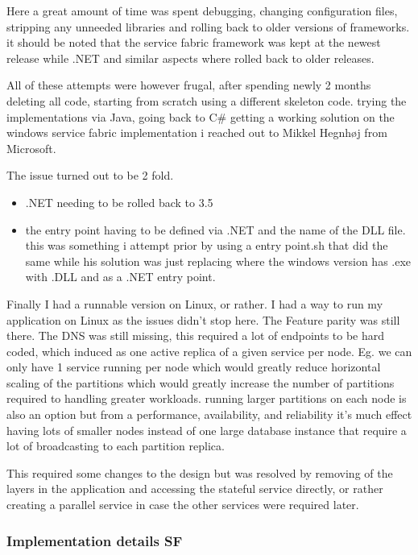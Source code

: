 \documentclass[a4paper,10pt,titlepage]{report}
\begin{document}
    Here a great amount of time was spent debugging, changing configuration files, stripping any unneeded libraries and rolling back to older versions of frameworks. it should be noted that the service fabric framework was kept at the newest release while .NET and similar aspects where rolled back to older releases.

    All of these attempts were however frugal, after spending newly 2 months deleting all code, starting from scratch using a different skeleton code. trying the implementations via Java, going back to C\# getting a working solution on the windows service fabric implementation i reached out to Mikkel Hegnhøj from Microsoft.

    The issue turned out to be 2 fold.
    \begin{itemize}
        \item .NET needing to be rolled back to 3.5
        \item the entry point having to be defined via .NET and the name of the DLL file. this was something i attempt prior by using a entry point.sh that did the same while his solution was just replacing where the windows version has .exe with .DLL and as a .NET entry point.
    \end{itemize}

    Finally I had a runnable version on Linux, or rather. I had a way to run my application on Linux as the issues didn't stop here. The Feature parity was still there. The DNS was still missing, this required a lot of endpoints to be hard coded, which induced as one active replica of a given service per node. Eg. we can only have 1 service running per node which would greatly reduce horizontal scaling of the partitions which would greatly increase the number of partitions required to handling greater workloads. running larger partitions on each node is also an option but from a performance, availability, and reliability it's much effect having lots of smaller nodes instead of one large database instance that require a lot of broadcasting to each partition replica.


    This required some changes to the design but was resolved by removing of the layers in the application and accessing the stateful service directly, or rather creating a parallel service in case the other services were required later.

    \subsubsection{Implementation details SF}
        
\end{document}
